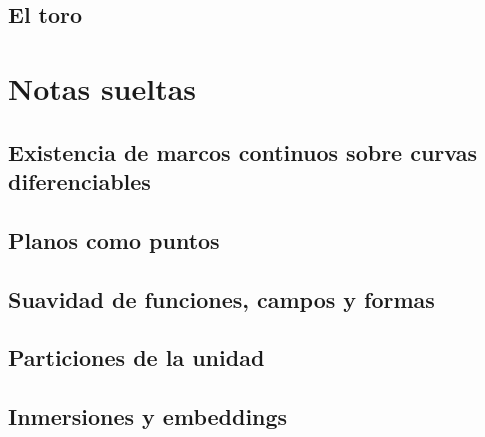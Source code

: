 \documentclass[11pt]{report}
\begin{document}
\section{El toro}
%
%


\chapter{Notas sueltas}

\section{Existencia de marcos continuos sobre curvas diferenciables}
%
%
\section{Planos como puntos}
%
\section{Suavidad de funciones, campos y formas}

\section{Particiones de la unidad}

\section{Inmersiones y embeddings}


\begin{thebibliography}{9}
%
\end{thebibliography}
\end{document}
